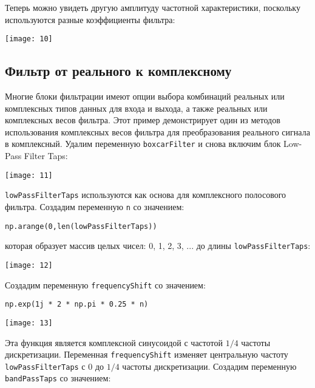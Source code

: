 Теперь можно увидеть другую амплитуду частотной характеристики, поскольку используются разные коэффициенты фильтра:

\begin{center}
    \texttt{[image: 10]}
\end{center}

\subsection{Фильтр от реального к комплексному}

Многие блоки фильтрации имеют опции выбора комбинаций реальных или комплексных типов данных для входа и выхода, а также реальных или комплексных весов фильтра. Этот пример демонстрирует один из методов использования комплексных весов фильтра для преобразования реального сигнала в комплексный. Удалим переменную \verb|boxcarFilter| и снова включим блок Low-Pass Filter Taps:

\begin{center}
    \texttt{[image: 11]}
\end{center}

\verb|lowPassFilterTaps| используются как основа для комплексного полосового фильтра. Создадим переменную \verb|n| со значением:

\begin{verbatim}
np.arange(0,len(lowPassFilterTaps))
\end{verbatim}

которая образует массив целых чисел: 0, 1, 2, 3, ... до длины \verb|lowPassFilterTaps|:

\begin{center}
    \texttt{[image: 12]}
\end{center}

Создадим переменную \verb|frequencyShift| со значением:

\begin{verbatim}
np.exp(1j * 2 * np.pi * 0.25 * n)
\end{verbatim}

\begin{center}
    \texttt{[image: 13]}
\end{center}

Эта функция является комплексной синусоидой с частотой \(1/4\) частоты дискретизации. Переменная \verb|frequencyShift| изменяет центральную частоту \verb|lowPassFilterTaps| с \(0\) до \(1/4\) частоты дискретизации. Создадим переменную \verb|bandPassTaps| со значением:

